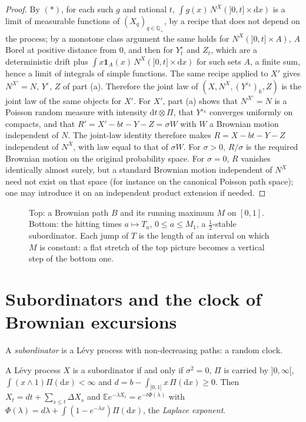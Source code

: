 \begin{proof}
By $(*)$, for each such $g$ and rational $t$, $\int g(x)\,N^X(]0,t]\times\mathrm dx)$ is a limit of measurable functions of $(X_q)_{q\in\mathbb Q_+}$, by a recipe that does not depend on the process; by a monotone class argument the same holds for $N^X(]0,t]\times A)$, $A$ Borel at positive distance from $0$, and then for $Y^\varepsilon_t$ and $Z_t$, which are a deterministic drift plus $\int x\mathbf 1_A(x)\,N^X(]0,t]\times\mathrm dx)$ for such sets $A$, a finite sum, hence a limit of integrals of simple functions. The same recipe applied to $X'$ gives $N^{X'}=N$, $Y^\varepsilon$, $Z$ of part (a). Therefore the
joint law of $(X,N^X,(Y^{\varepsilon_k})_k,Z)$ is the joint law of the same objects for $X'$. For $X'$, part (a) shows that $N^{X'}=N$ is a Poisson random measure with intensity $\mathrm dt\otimes\Pi$, that $Y^{\varepsilon_k}$
converges uniformly on compacts, and that $R'=X'-bt-Y-Z=\sigma W$ with $W$ a Brownian motion independent of $N$. The joint-law identity therefore makes $R=X-bt-Y-Z$ independent of $N^X$, with law equal to that of $\sigma W$. For $\sigma>0$, $R/\sigma$ is the required Brownian motion on the original probability space. For $\sigma=0$, $R$ vanishes identically almost surely, but a standard Brownian motion independent of $N^X$ need not exist on that space (for instance on the canonical Poisson path space); one may introduce it on an independent product extension if needed.
\end{proof}

\begin{figure}[ht]
\centering
{}
\caption{Top: a Brownian path $B$ and its running maximum $M$ on $[0,1]$. Bottom: the hitting times $a\mapsto T_a$, $0\le a\le M_1$, a $\frac12$-stable subordinator. Each jump of $T$ is the length of an interval on which $M$
is constant: a flat stretch of the top picture becomes a vertical step of the bottom one.}
\label{fig:subordinator}
\end{figure}

\section{Subordinators and the clock of Brownian excursions}

A \emph{subordinator} is a L\'evy process with non-decreasing paths: a random clock.

\begin{corollary}\label{cor:subordinator}
A L\'evy process $X$ is a subordinator if and only if $\sigma^2=0$, $\Pi$ is carried by $]0,\infty[$, $\int(x\wedge1)\Pi(\mathrm dx)<\infty$ and $d=b-\int_{]0,1]}x\,\Pi(\mathrm dx)\ge0$. Then
$X_t=dt+\sum_{s\le t}\Delta X_s$ and $\mathbb Ee^{-\lambda X_t}=e^{-t\Phi(\lambda)}$ with $\Phi(\lambda)=d\lambda+\int(1-e^{-\lambda x})\Pi(\mathrm dx)$, the \emph{Laplace exponent}.
\end{corollary}

